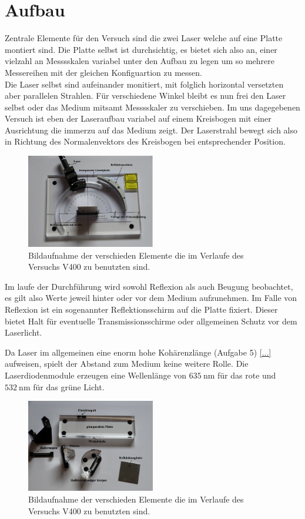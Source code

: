 \section{Aufbau}
Zentrale Elemente für den Versuch sind die zwei Laser welche auf eine Platte montiert sind. Die Platte selbst ist durchsichtig,
es bietet sich also an, einer vielzahl an Messsskalen variabel unter den Aufbau zu legen um so mehrere Messereihen mit der gleichen 
Konfiguartion zu messen. \\
Die Laser selbst sind aufeinander monitiert, mit folglich horizontal versetzten aber parallelen Strahlen. Für verschiedene
Winkel bleibt es nun frei den Laser selbst oder das Medium mitsamt Messsskaler zu verschieben. Im uns dagegebenen Versuch 
ist eben der Laseraufbau variabel auf einem Kreisbogen mit einer Ausrichtung die immerzu auf das Medium zeigt. Der Laserstrahl 
bewegt sich also in Richtung des Normalenvektors des Kreisbogen bei entsprechender Position. 
\begin{figure}
    \centering
    \includegraphics[width=0.5\textwidth]{bilder/afbau.png}
    \caption{Bildaufnahme der verschieden Elemente die im Verlaufe des Versuchs V400 zu benutzten sind. \cite{skript}} 
    \label{fig:teile}
\end{figure}
\FloatBarrier
\flushleft Im laufe der Durchführung wird sowohl Reflexion als auch Beugung beobachtet, es gilt also Werte jeweil hinter oder vor dem Medium 
aufzunehmen. Im Falle von Reflexion ist ein sogenannter Reflektionsschirm auf die Platte fixiert. Dieser bietet Halt für eventuelle
Transmissionsschirme oder allgemeinen Schutz vor dem Laserlicht.

Da Laser im allgemeinen eine enorm hohe Kohärenzlänge (Aufgabe 5) \ref{...} aufweisen, spielt der Abstand zum Medium keine weitere Rolle. 
Die Laserdiodenmodule erzeugen eine Wellenlänge von $\SI{635}{\nano\meter}$ für das rote und $\SI{532}{\nano\meter}$ für das
grüne Licht.

\begin{figure}
    \centering
    \includegraphics[width=0.5\textwidth]{bilder/teile.png}
    \caption{Bildaufnahme der verschieden Elemente die im Verlaufe des Versuchs V400 zu benutzten sind. \cite{skript}} 
    \label{fig:teile}
\end{figure}
\FloatBarrier

